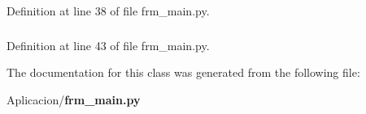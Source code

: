 \-Definition at line 38 of file frm\-\_\-main.\-py.

\subsubsection[{list\-Widget}]{}\label{class_aplicacion_1_1frm__main_1_1_proc_a_rx_c_o_d_e_aba9c3be396df199bcf42610cbd4ca031}


\-Definition at line 43 of file frm\-\_\-main.\-py.



\-The documentation for this class was generated from the following file\-:\begin{DoxyCompactItemize}
\item 
\-Aplicacion/{\bf frm\-\_\-main.\-py}\end{DoxyCompactItemize}
